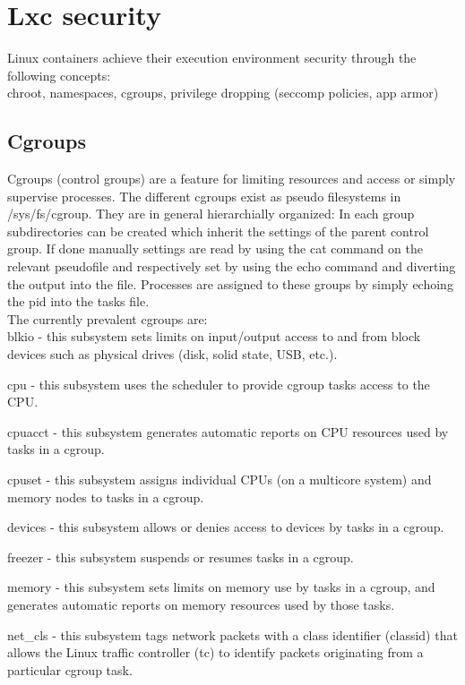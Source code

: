 \chapter{Lxc security}

Linux containers achieve their execution environment security through the following concepts:\\
chroot, namespaces, cgroups, privilege dropping (seccomp policies, app armor)\\

\section{Cgroups}

Cgroups (control groups) are a feature for limiting resources and access or simply supervise processes. The different cgroups exist as
pseudo filesystems in /sys/fs/cgroup. They are in general hierarchially organized: In each group subdirectories can be created
which inherit the settings of the parent control group. If done manually settings are read by using the cat command on the relevant
pseudofile and respectively set by using the echo command and diverting the output into the file. Processes are assigned to these groups
by simply echoing the pid into the tasks file.\\
The currently prevalent cgroups are:\\
blkio - this subsystem sets limits on input/output access to and from block devices such as physical drives (disk, solid state, USB, etc.). 

cpu - this subsystem uses the scheduler to provide cgroup tasks access to the CPU. 

cpuacct - this subsystem generates automatic reports on CPU resources used by tasks in a cgroup. 

cpuset - this subsystem assigns individual CPUs (on a multicore system) and memory nodes to tasks in a cgroup. 

devices - this subsystem allows or denies access to devices by tasks in a cgroup. 

freezer - this subsystem suspends or resumes tasks in a cgroup. 

memory - this subsystem sets limits on memory use by tasks in a cgroup, and generates automatic reports on memory resources used by those tasks. 

net\_cls - this subsystem tags network packets with a class identifier (classid) that allows the Linux traffic controller (tc) to identify
packets originating from a particular cgroup task. 

